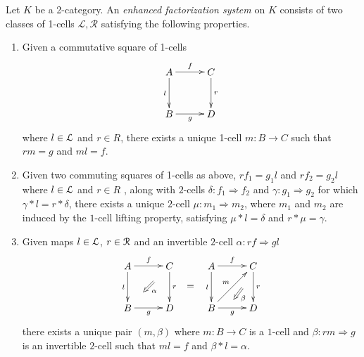\begin{Defi}\label{Defi:efs}
Let $K$ be a 2-category. An \emph{enhanced factorization system} on $K$ consists of two classes of 1-cells $\mathcal{L},\mathcal{R}$ satisfying the following properties.
\begin{enumerate}
\item Given a commutative square of 1-cells
     \[
        \xy
            (0,0)*+{A}="00";
            (15,0)*+{C}="10";
            (0,-15)*+{B}="01";
            (15,-15)*+{D}="11";
            {\ar^{f} "00" ; "10"};
            {\ar^{r} "10" ; "11"};
            {\ar_{l} "00" ; "01"};
            {\ar_{g} "01" ; "11"};
        \endxy
     \]
where $l \in \mathcal{L}$ and $r \in {R}$, there exists a unique 1-cell $m \colon B \rightarrow C$ such that $rm = g$ and $ml = f$.
\item Given two commuting squares  of 1-cells as above, $rf_1 = g_1l$ and $rf_2 = g_2l$ where $l \in \mathcal{L}$ and $r \in {R}$ , along with $2$-cells $\delta \colon f_1 \Rightarrow f_2$ and $\gamma \colon g_1 \Rightarrow g_2$ for which $\gamma \ast l = r \ast \delta$, there exists a unique $2$-cell $\mu \colon m_1 \Rightarrow m_2$, where $m_1$ and $m_2$ are induced by the $1$-cell lifting property, satisfying $\mu \ast l = \delta$ and $r \ast \mu = \gamma$.
\item Given maps $l \in \mathcal{L}$, $r \in \mathcal{R}$ and an invertible $2$-cell $\alpha \colon rf \Rightarrow gl$
    \[
        \xy
            (0,0)*+{A}="00";
            (15,0)*+{C}="10";
            (0,-15)*+{B}="01";
            (15,-15)*+{D}="11";
            {\ar^{f} "00" ; "10"};
            {\ar^{r} "10" ; "11"};
            {\ar_{l} "00" ; "01"};
            {\ar_{g} "01" ; "11"};
            {\ar@{=>}^{\alpha} (9.375,-5.625) ; (5.625,-9.375)};
            (22.5,-7.5)*+{=};
            (30,0)*+{A}="20";
            (45,0)*+{C}="30";
            (30,-15)*+{B}="21";
            (45,-15)*+{D}="31";
            {\ar^{f} "20" ; "30"};
            {\ar^{r} "30" ; "31"};
            {\ar_{l} "20" ; "21"};
            {\ar_{g} "21" ; "31"};
            {\ar^{m} "21" ; "30"};
            {\ar@{=>}^{\beta} (41,-8) ; (38,-12)};
        \endxy
    \]
there exists a unique pair $(m,\beta)$ where $m \colon B \rightarrow C$ is a $1$-cell and $\beta \colon rm \Rightarrow g$ is an invertible $2$-cell such that $ml = f$ and $\beta \ast l = \alpha$.
\end{enumerate}
\end{Defi}


